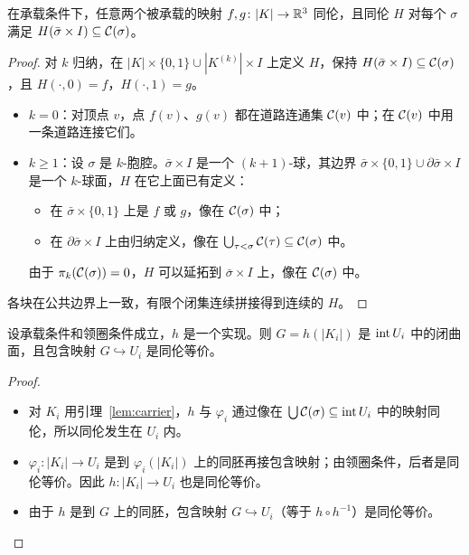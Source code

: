 \begin{lemma}[承载引理]\label{lem:carrier}
在承载条件下，任意两个被承载的映射 $f,g\colon|K|\to\mathbb{R}^3$ 同伦，且同伦 $H$ 对每个 $\sigma$ 满足 $H(\bar\sigma\times I)\subseteq\mathcal{C}(\sigma)$。
\end{lemma}
\begin{proof}
对 $k$ 归纳，在 $|K|\times\{0,1\}\cup|K^{(k)}|\times I$ 上定义 $H$，保持 $H(\bar\sigma\times I)\subseteq\mathcal{C}(\sigma)$，且 $H(\cdot,0)=f$，$H(\cdot,1)=g$。
\begin{itemize}
\item $k=0$：对顶点 $v$，点 $f(v)$、$g(v)$ 都在道路连通集 $\mathcal{C}(v)$ 中；在 $\mathcal{C}(v)$ 中用一条道路连接它们。
\item $k\ge1$：设 $\sigma$ 是 $k$-胞腔。$\bar\sigma\times I$ 是一个 $(k+1)$-球，其边界 $\bar\sigma\times\{0,1\}\cup\partial\bar\sigma\times I$ 是一个 $k$-球面，$H$ 在它上面已有定义：
  \begin{itemize}
  \item 在 $\bar\sigma\times\{0,1\}$ 上是 $f$ 或 $g$，像在 $\mathcal{C}(\sigma)$ 中；
  \item 在 $\partial\bar\sigma\times I$ 上由归纳定义，像在 $\bigcup_{\tau<\sigma}\mathcal{C}(\tau)\subseteq\mathcal{C}(\sigma)$ 中。
  \end{itemize}
  由于 $\pi_k(\mathcal{C}(\sigma))=0$，$H$ 可以延拓到 $\bar\sigma\times I$ 上，像在 $\mathcal{C}(\sigma)$ 中。
\end{itemize}
各块在公共边界上一致，有限个闭集连续拼接得到连续的 $H$。
\end{proof}

\begin{lemma}[分隔]\label{lem:separation}
设承载条件和领圈条件成立，$h$ 是一个实现。则 $G=h(|K_i|)$ 是 $\operatorname{int} U_i$ 中的闭曲面，且包含映射 $G\hookrightarrow U_i$ 是同伦等价。
\end{lemma}
\begin{proof}
\begin{itemize}
\item 对 $K_i$ 用引理~\ref{lem:carrier}，$h$ 与 $\varphi_i$ 通过像在 $\bigcup\mathcal{C}(\sigma)\subseteq\operatorname{int} U_i$ 中的映射同伦，所以同伦发生在 $U_i$ 内。
\item $\varphi_i\colon|K_i|\to U_i$ 是到 $\varphi_i(|K_i|)$ 上的同胚再接包含映射；由领圈条件，后者是同伦等价。因此 $h\colon|K_i|\to U_i$ 也是同伦等价。
\item 由于 $h$ 是到 $G$ 上的同胚，包含映射 $G\hookrightarrow U_i$（等于 $h\circ h^{-1}$）是同伦等价。
\end{itemize}
\end{proof}


